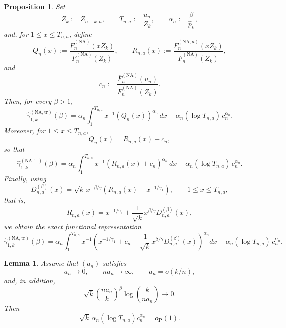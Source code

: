 \documentclass[10pt,a4paper]{amsart}
\newtheorem{proposition}{Proposition}
\newtheorem{lemma}{Lemma}
\begin{document}
\begin{proposition}
\label{prop:app-functional} Set
\[
Z_{k}:=Z_{n-k:n}, \qquad T_{n,a}:=\frac{u_{n}}{Z_{k}}, \qquad\alpha_{n}%
:=\frac{\beta}{\widehat{p}_{k}},
\]
and, for $1\leq x\leq T_{n,a}$, define
\[
Q_{n}(x) := \frac{\overline{F}_{n}^{(\mathrm{NA})}(xZ_{k})} {\overline{F}%
_{n}^{(\mathrm{NA})}(Z_{k})}, \qquad R_{n,a}(x) := \frac{\overline{F}%
_{n}^{(\mathrm{NA},a)}(xZ_{k})} {\overline{F}_{n}^{(\mathrm{NA})}(Z_{k})},
\]
and
\[
c_{n} := \frac{\overline{F}_{n}^{(\mathrm{NA})}(u_{n})} {\overline{F}%
_{n}^{(\mathrm{NA})}(Z_{k})}.
\]
Then, for every $\beta>1$,
\begin{equation}
\widehat{\gamma}_{1,k}^{(\mathrm{NA,tr})}(\beta) = \alpha_{n} \int%
_{1}^{T_{n,a}} x^{-1} \left(  Q_{n}(x)\right)  ^{\alpha_{n}} \,dx - \alpha
_{n}(\log T_{n,a})\,c_{n}^{\alpha_{n}}. \label{eq:app-functional-Q}%
\end{equation}
Moreover, for $1\leq x\leq T_{n,a}$,
\[
Q_{n}(x)=R_{n,a}(x)+c_{n},
\]
so that
\begin{equation}
\widehat{\gamma}_{1,k}^{(\mathrm{NA,tr})}(\beta) = \alpha_{n} \int%
_{1}^{T_{n,a}} x^{-1} \left(  R_{n,a}(x)+c_{n}\right)  ^{\alpha_{n}} \,dx -
\alpha_{n}(\log T_{n,a})\,c_{n}^{\alpha_{n}}. \label{eq:app-functional-R}%
\end{equation}
Finally, using
\[
D_{n,a}^{(\beta)}(x) = \sqrt{k}\,x^{-\beta/\gamma} \left(  R_{n,a}%
(x)-x^{-1/\gamma_{1}} \right)  , \qquad1\leq x\leq T_{n,a},
\]
that is,
\[
R_{n,a}(x) = x^{-1/\gamma_{1}} + \frac{1}{\sqrt{k}}x^{\beta/\gamma}%
D_{n,a}^{(\beta)}(x),
\]
we obtain the exact functional representation
\begin{equation}
\widehat{\gamma}_{1,k}^{(\mathrm{NA,tr})}(\beta) = \alpha_{n} \int%
_{1}^{T_{n,a}} x^{-1} \left(  x^{-1/\gamma_{1}} + c_{n} + \frac{1}{\sqrt{k}%
}x^{\beta/\gamma}D_{n,a}^{(\beta)}(x) \right)  ^{\alpha_{n}} dx - \alpha
_{n}(\log T_{n,a})\,c_{n}^{\alpha_{n}}. \label{eq:app-functional-D}%
\end{equation}

\end{proposition}

\begin{lemma}
\label{lem:boundary-truncation} Assume that $(a_{n})$ satisfies
\[
a_{n}\to0,\qquad na_{n}\to\infty,\qquad a_{n}=o(k/n),
\]
and, in addition,
\[
\sqrt{k} \left(  \frac{na_{n}}{k}\right)  ^{\beta} \log\!\left(  \frac
{k}{na_{n}}\right)  \to0.
\]
Then
\[
\sqrt{k}\,\alpha_{n}(\log T_{n,a})c_{n}^{\alpha_{n}} = o_{\mathbf{P}}(1).
\]

\end{lemma}
\end{document}
